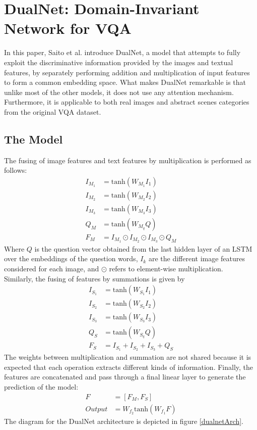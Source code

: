 \documentclass{article}
\begin{document}
\section{DualNet: Domain-Invariant Network for VQA}\label{dualnetSec}
In this paper, Saito et al. \citep{corrSaito16} introduce DualNet, a model that attempts to fully exploit the discriminative information provided by the images and textual features, by separately performing addition and multiplication of input features to form a common embedding space. What makes DualNet remarkable is that unlike most of the other models, it does not use any attention mechanism. Furthermore, it is applicable to both real images and abstract scenes categories from the original VQA dataset.
\subsection{The Model}
The fusing of image features and text features by multiplication is performed as follows:
\begin{align*}
    I_{M_1} &= \text{tanh}(W_{M_1}I_1)\\
    I_{M_2} &= \text{tanh}(W_{M_2}I_2)\\
    I_{M_3} &= \text{tanh}(W_{M_3}I_3)\\
    Q_M &= \text{tanh}(W_{M_q}Q)\\
    F_M &= I_{M_1} \odot I_{M_2} \odot I_{M_3} \odot Q_M
\end{align*}
Where $Q$ is the question vector obtained from the last hidden layer of an LSTM over the embeddings of the question words, $I_k$ are the different image features considered for each image, and $\odot$ refers to element-wise multiplication.\\
Similarly, the fusing of features by summations is given by
\begin{align*}
    I_{S_1} &= \text{tanh}(W_{S_1}I_1)\\
    I_{S_2} &= \text{tanh}(W_{S_2}I_2)\\
    I_{S_3} &= \text{tanh}(W_{S_3}I_3)\\
    Q_S &= \text{tanh}(W_{S_q}Q)\\
    F_S &= I_{S_1} + I_{S_2} + I_{S_3} + Q_S
\end{align*}
The weights between multiplication and summation are not shared because it is expected that each operation extracts different kinds of information. Finally, the features are concatenated and pass through a final linear layer to generate the prediction of the model:
\begin{align*}
    F &= [F_M, F_S]\\
    Output &= W_{f_2} \text{tanh}(W_{f_1}F)
\end{align*}
The diagram for the DualNet architecture is depicted in figure \ref{dualnetArch}.
\end{document}
